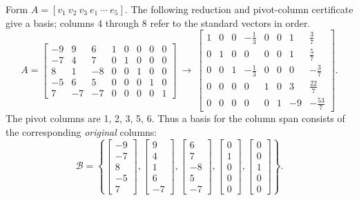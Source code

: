 Form $A=[v_1\ v_2\ v_3\ e_1\ \cdots\ e_5]$. The following reduction and pivot-column certificate give a basis; columns 4 through 8 refer to the standard vectors in order.
\[A=\left[\begin{array}{rrrrrrrr}-9&9&6&1&0&0&0&0\\-7&4&7&0&1&0&0&0\\8&1&-8&0&0&1&0&0\\-5&6&5&0&0&0&1&0\\7&-7&-7&0&0&0&0&1\end{array}\right]\ \longrightarrow\ \left[\begin{array}{rrrrrrrr}1&0&0&- \frac{1}{3}&0&0&1&\frac{3}{7}\\0&1&0&0&0&0&1&\frac{5}{7}\\0&0&1&- \frac{1}{3}&0&0&0&- \frac{3}{7}\\0&0&0&0&1&0&3&\frac{22}{7}\\0&0&0&0&0&1&-9&- \frac{53}{7}\end{array}\right].\]
The pivot columns are 1, 2, 3, 5, 6. Thus a basis for the column span consists of the corresponding \emph{original} columns:
\[\mathcal B=\left\{\left[\begin{array}{r}-9\\-7\\8\\-5\\7\end{array}\right],\left[\begin{array}{r}9\\4\\1\\6\\-7\end{array}\right],\left[\begin{array}{r}6\\7\\-8\\5\\-7\end{array}\right],\left[\begin{array}{r}0\\1\\0\\0\\0\end{array}\right],\left[\begin{array}{r}0\\0\\1\\0\\0\end{array}\right]\right\}.\]
